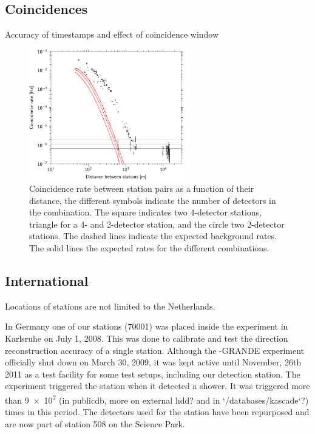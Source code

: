 \subsection{Coincidences}

Accuracy of timestamps and effect of coincidence window

\begin{figure}
    \centering
    \includegraphics[width=0.6\textwidth]
                    {plots/experiment/distance_v_coincidence_rate}
    \caption{Coincidence rate between station pairs as a function of their distance, the different symbols indicate the number of detectors in the combination. The square indicates two 4-detector stations, triangle for a 4- and 2-detector station, and the circle two 2-detector stations. The dashed lines indicate the expected background rates. The solid lines the expected rates for the different combinations.}
    \label{fig:network-distances}
\end{figure}


\subsection{International}

Locations of \hisparc stations are not limited to the Netherlands.

In Germany one of our stations (70001) was placed inside the \kascade experiment in Karlsruhe on July 1, 2008. This was done to calibrate and test the direction reconstruction accuracy of a single \hisparc station. Although the \kascade-GRANDE \cite{kascade:grande} experiment officially shut down on March 30, 2009, it was kept active until November, 26th 2011 as a test facility for some test setups, including our detection station. The \kascade experiment \cite{kascade:experiment} triggered the \hisparc station when it detected a shower. It was triggered more than \num{9e7} (in publicdb, more on external hdd? and in `/databases/kascade`?) times in this period. The detectors used for the \kascade station have been repurposed and are now part of station 508 on the Science Park.

